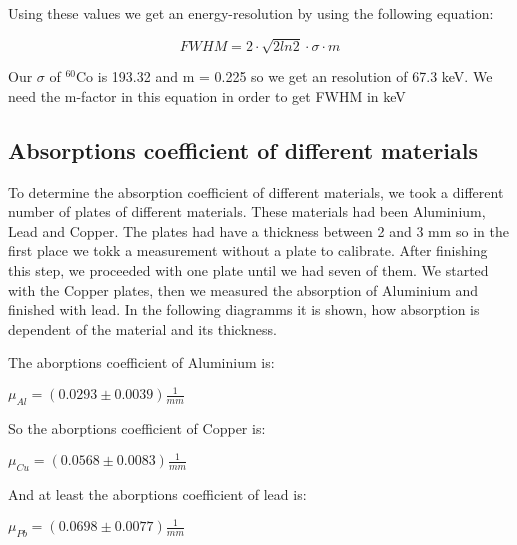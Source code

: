 
Using these values we get an energy-resolution by using the following equation:

\begin{equation}
FWHM = 2\cdot \sqrt{2 ln 2} \cdot \sigma \cdot m
\end{equation}

Our $\sigma$ of $^{60}$Co is 193.32 and m = 0.225 so we get an resolution of 67.3 keV. We need the m-factor in this equation in order to get FWHM in keV

\subsection{Absorptions coefficient of different materials}
To determine the absorption coefficient of different materials, we took a different number of plates of different materials. These materials had been Aluminium, Lead and Copper. The plates had have a thickness between 2 and 3 mm so in the first place we tokk a measurement without a plate to calibrate. After finishing this step, we proceeded with one plate until we had seven of them. We started with the Copper plates, then we measured the absorption of Aluminium and finished with lead.
In the following diagramms it is shown, how absorption is dependent of the material and its thickness.\\


The aborptions coefficient of Aluminium is:
\begin{center}
$\mu_{Al} = (0.0293 \pm 0.0039)\frac{1}{mm}$
\end{center}


So the aborptions coefficient of Copper is:
\begin{center}
$\mu_{Cu} = (0.0568 \pm 0.0083)\frac{1}{mm}$
\end{center}


And at least the aborptions coefficient of lead is:
\begin{center}
$\mu_{Pb} = (0.0698 \pm 0.0077)\frac{1}{mm}$
\end{center}


